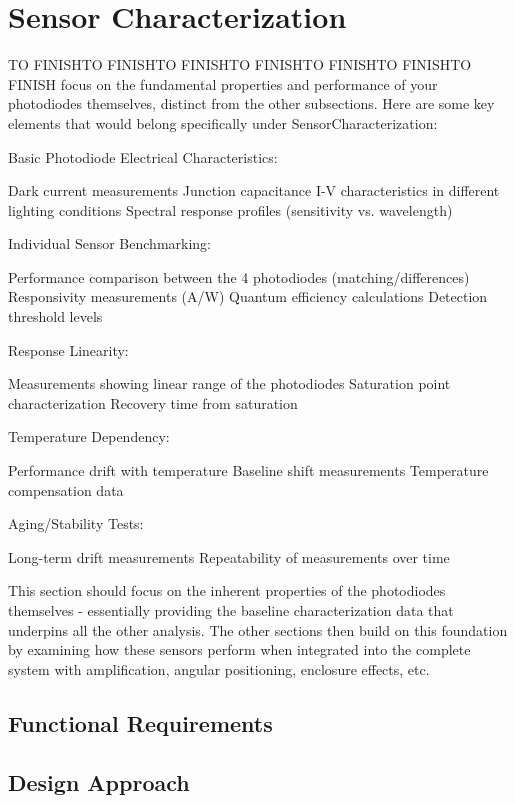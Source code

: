 \section{Sensor Characterization}
%
%
%
TO FINISHTO FINISHTO FINISHTO FINISHTO FINISHTO FINISHTO FINISH focus on the fundamental properties and performance of your photodiodes themselves, distinct from the other subsections. Here are some key elements that would belong specifically under SensorCharacterization:

Basic Photodiode Electrical Characteristics:

Dark current measurements
Junction capacitance
I-V characteristics in different lighting conditions
Spectral response profiles (sensitivity vs. wavelength)


Individual Sensor Benchmarking:

Performance comparison between the 4 photodiodes (matching/differences)
Responsivity measurements (A/W)
Quantum efficiency calculations
Detection threshold levels


Response Linearity:

Measurements showing linear range of the photodiodes
Saturation point characterization
Recovery time from saturation


Temperature Dependency:

Performance drift with temperature
Baseline shift measurements
Temperature compensation data


Aging/Stability Tests:

Long-term drift measurements
Repeatability of measurements over time



This section should focus on the inherent properties of the photodiodes themselves - essentially providing the baseline characterization data that underpins all the other analysis. The other sections then build on this foundation by examining how these sensors perform when integrated into the complete system with amplification, angular positioning, enclosure effects, etc.



\subsection{Functional Requirements}

\subsection{Design Approach}

